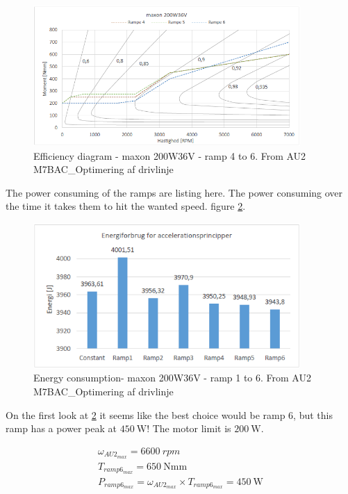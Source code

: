 \begin{figure}[H]
	\centering
	\includegraphics [width=4in]{Software/Pictures/Momentramper-4-6.PNG}
	\caption{Efficiency diagram - maxon 200W36V - ramp 4 to 6. From AU2 M7BAC\_Optimering af drivlinje}
	\label{fig:eff_maxon_36V_ramp4-6}
\end{figure}

The power consuming of the ramps are listing here. The power consuming over the time it takes them to hit the wanted speed. figure \ref{fig:eff_maxon_36V_ramp_energy-consumption}.

\begin{figure}[H]
	\centering
	\includegraphics [width=4in]{Software/Pictures/energy-consumption.PNG}
	\caption{Energy consumption- maxon 200W36V - ramp 1 to 6. From AU2 M7BAC\_Optimering af drivlinje}
	\label{fig:eff_maxon_36V_ramp_energy-consumption}
\end{figure}

On the first look at \ref{fig:eff_maxon_36V_ramp_energy-consumption} it seems like the best choice would be ramp 6, but  this ramp has a power peak at $ \SI{450}{\watt} $! The motor limit is $ \SI{200}{\watt} $. 

\begin{equation}
	\begin{split}
		\omega_{AU2_{max}} = \SI{6600}{rpm}\\
		T_{ramp6_{max}} = \SI{650}{\newton \milli\metre} \\
		P_{ramp6_{max}} = \omega_{AU2_{max}} \times T_{ramp6_{max}} = \SI{450}{\watt}
	\end{split}
\end{equation}

